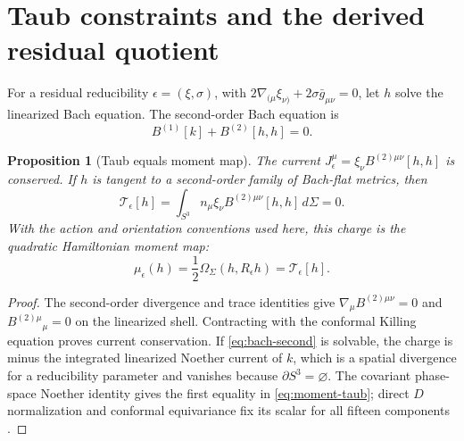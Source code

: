 \documentclass[11pt]{article}
\newtheorem{proposition}[theorem]{Proposition}
\theoremstyle{remark}
\begin{document}
\section{Taub constraints and the derived residual quotient}

For a residual reducibility $\epsilon=(\xi,\sigma)$, with
$2\nabla_{(\mu}\xi_{\nu)}+2\sigma\bar g_{\mu\nu}=0$, let $h$ solve the
linearized Bach equation.  The second-order Bach equation is
\begin{equation}\label{eq:bach-second}
 B^{(1)}[k]+B^{(2)}[h,h]=0.
\end{equation}

\begin{proposition}[Taub equals moment map]\label{prop:taub}
The current $J_\epsilon^\mu=\xi_\nu B^{(2)\mu\nu}[h,h]$ is conserved.  If
$h$ is tangent to a second-order family of Bach-flat metrics, then
\begin{equation}\label{eq:taub}
 \mathcal T_\epsilon[h]
 =\int_{S^3}n_\mu\xi_\nu B^{(2)\mu\nu}[h,h]\,d\Sigma=0.
\end{equation}
With the action and orientation conventions used here, this charge is the
quadratic Hamiltonian moment map:
\begin{equation}\label{eq:moment-taub}
 \mu_\epsilon(h)=\frac12\Omega_\Sigma(h,R_\epsilon h)
 =\mathcal T_\epsilon[h].
\end{equation}
\end{proposition}

\begin{proof}
The second-order divergence and trace identities give
$\nabla_\mu B^{(2)\mu\nu}=0$ and $B^{(2)\mu}{}_{\mu}=0$ on the linearized
shell.  Contracting with the conformal Killing equation proves current
conservation.  If \eqref{eq:bach-second} is solvable, the charge is minus the
integrated linearized Noether current of $k$, which is a spatial divergence
for a reducibility parameter and vanishes because $\partial S^3=\varnothing$.
The covariant phase-space Noether identity gives the first equality in
\eqref{eq:moment-taub}; direct $D$ normalization and conformal equivariance
fix its scalar for all fifteen components
\cite{AltasTekinLinearization,BarnichBrandtHenneaux}.
\end{proof}
\end{document}
